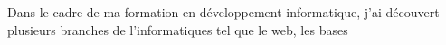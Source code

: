 \documentclass[a4paper, 11pt, french]{report}
\begin{document}
                                                                                                                        Dans
                                                                                                                        le
                                                                                                                        cadre
                                                                                                                        de
                                                                                                                        ma
                                                                                                                        formation
                                                                                                                        en
                                                                                                                        développement
                                                                                                                        informatique,
                                                                                                                        j'ai
                                                                                                                        découvert
                                                                                                                        plusieurs
                                                                                                                        branches
                                                                                                                        de
                                                                                                                        l'informatiques
                                                                                                                        tel
                                                                                                                        que
                                                                                                                        le
                                                                                                                        web,
                                                                                                                        les
                                                                                                                        bases
\end{document}
